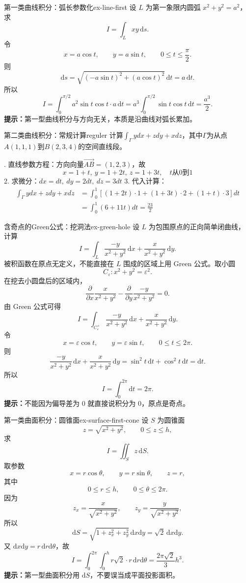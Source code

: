 \documentclass[UTF8,zihao=-4,openany]{ctexbook}
\begin{document}
\begin{example}{第一类曲线积分：弧长参数化}{ex-line-first}
设 $L$ 为第一象限内圆弧 $x^2+y^2=a^2$，求
\[
  I=\int_L xy\,\mathrm{d}s.
\]
\tcblower
令
\[
  x=a\cos t,\qquad y=a\sin t,\qquad 0\leq t\leq \frac{\pi}{2}.
\]
则
\[
  \mathrm{d}s=\sqrt{(-a\sin t)^2+(a\cos t)^2}\,\mathrm{d}t=a\,\mathrm{d}t.
\]
所以
\[
  I=\int_0^{\pi/2}a^2\sin t\cos t\cdot a\,\mathrm{d}t
  =a^3\int_0^{\pi/2}\sin t\cos t\,\mathrm{d}t
  =\frac{a^3}{2}.
\]
\textbf{提示：}第一型曲线积分与方向无关，本质是沿曲线对弧长累加。
\end{example}

\begin{example}{第二类曲线积分：常规计算}{reguler}
计算$\displaystyle\int_\Gamma ydx + zdy + xdz$，其中$\Gamma$为从点$A(1,1,1)$到$B(2,3,4)$的空间直线段。

. 直线参数方程：方向向量$\overrightarrow{AB}=(1,2,3)$，故
$$x=1+t,\ y=1+2t,\ z=1+3t,\quad t\text{从}0\text{到}1$$
2. 求微分：$dx=dt,\ dy=2dt,\ dz=3dt$
3. 代入计算：
$$
\begin{aligned}
\int_\Gamma ydx + zdy + xdz &= \int_0^1 \left[ (1+2t)\cdot1 + (1+3t)\cdot2 + (1+t)\cdot3 \right]dt \\
&= \int_0^1 (6+11t)dt = \frac{23}{2}
\end{aligned}
$$
\end{example}

\begin{example}{含奇点的Green公式：挖洞法}{ex-green-hole}
设 $L$ 为包围原点的正向简单闭曲线，计算
\[
  I=\int_L\frac{-y}{x^2+y^2}\,\mathrm{d}x+\frac{x}{x^2+y^2}\,\mathrm{d}y.
\]
\tcblower
被积函数在原点无定义，不能直接在 $L$ 围成的区域上用 Green 公式。取小圆
\[
  C_\varepsilon:x^2+y^2=\varepsilon^2.
\]
在挖去小圆盘后的区域内，
\[
  \frac{\partial}{\partial x}\frac{x}{x^2+y^2}
  -
  \frac{\partial}{\partial y}\frac{-y}{x^2+y^2}=0.
\]
由 Green 公式可得
\[
  I=\int_{C_\varepsilon^+}\frac{-y}{x^2+y^2}\,\mathrm{d}x+\frac{x}{x^2+y^2}\,\mathrm{d}y.
\]
令
\[
  x=\varepsilon\cos t,\qquad y=\varepsilon\sin t,\qquad 0\leq t\leq 2\pi.
\]
则
\[
  \frac{-y}{x^2+y^2}\,\mathrm{d}x+\frac{x}{x^2+y^2}\,\mathrm{d}y
  =
  \sin^2t\,\mathrm{d}t+\cos^2t\,\mathrm{d}t
  =
  \mathrm{d}t.
\]
所以
\[
  I=\int_0^{2\pi}\mathrm{d}t=2\pi.
\]
\textbf{提示：}不能因为偏导差为 $0$ 就直接说积分为 $0$，原点是奇点。
\end{example}

\begin{example}{第一类曲面积分：圆锥面}{ex-surface-first-cone}
设 $S$ 为圆锥面
\[
  z=\sqrt{x^2+y^2},\qquad 0\leq z\leq h,
\]
求
\[
  I=\iint_S z\,\mathrm{d}S.
\]
\tcblower
取参数
\[
  x=r\cos\theta,\qquad y=r\sin\theta,\qquad z=r,
\]
其中
\[
  0\leq r\leq h,\qquad 0\leq\theta\leq2\pi.
\]
因为
\[
  z_x=\frac{x}{\sqrt{x^2+y^2}},\qquad z_y=\frac{y}{\sqrt{x^2+y^2}},
\]
所以
\[
  \mathrm{d}S=\sqrt{1+z_x^2+z_y^2}\,\mathrm{d}x\mathrm{d}y
  =\sqrt2\,\mathrm{d}x\mathrm{d}y.
\]
又 $\mathrm{d}x\mathrm{d}y=r\,\mathrm{d}r\mathrm{d}\theta$，故
\[
  I=\int_0^{2\pi}\int_0^h r\sqrt2\cdot r\,\mathrm{d}r\mathrm{d}\theta
  =\frac{2\pi\sqrt2}{3}h^3.
\]
\textbf{提示：}第一型曲面积分用 $\mathrm{d}S$，不要误当成平面投影面积。
\end{example}
\end{document}
